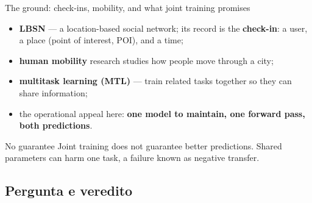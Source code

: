 \documentclass{beamer}
\begin{document}
\begin{frame}{The ground: check-ins, mobility, and what joint training promises}
    \begin{itemize}\setlength{\itemsep}{4pt}
        \item \textbf{LBSN} --- a location-based social network; its record is the
              \textbf{check-in}: a user, a place (point of interest, POI), and a time;
        \item \textbf{human mobility} research studies how people move through a city;
        \item \textbf{multitask learning (MTL)} --- train related tasks together so they can
              share information;
        \item the operational appeal here: \textbf{one model to maintain, one forward pass,
              both predictions}.
    \end{itemize}

    \bigskip
    \begin{alertblock}{No guarantee}
        \small
        Joint training does not guarantee better predictions. Shared parameters can harm one
        task, a failure known as \alert{negative transfer}.
    \end{alertblock}
\end{frame}

\subsection{Pergunta e veredito}
\end{document}
